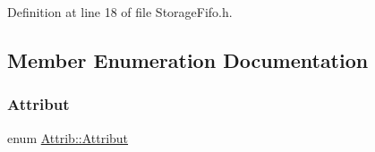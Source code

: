 Definition at line 18 of file Storage\+Fifo.\+h.



\subsection{Member Enumeration Documentation}
\mbox{\label{classAttrib_a69e171d7cc6417835a5a306d3c764235}} 
\subsubsection{\texorpdfstring{Attribut}{Attribut}}
{\footnotesize\ttfamily enum \hyperlink{classAttrib_a69e171d7cc6417835a5a306d3c764235}{Attrib\+::\+Attribut}\hspace{0.3cm}{\ttfamily [inherited]}}

